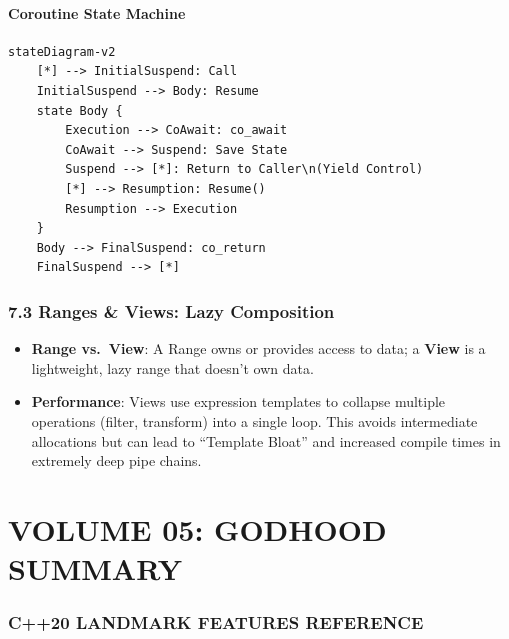 \hypertarget{coroutine-state-machine}{%
\paragraph{Coroutine State Machine}\label{coroutine-state-machine}}

\begin{lstlisting}
stateDiagram-v2
    [*] --> InitialSuspend: Call
    InitialSuspend --> Body: Resume
    state Body {
        Execution --> CoAwait: co_await
        CoAwait --> Suspend: Save State
        Suspend --> [*]: Return to Caller\n(Yield Control)
        [*] --> Resumption: Resume()
        Resumption --> Execution
    }
    Body --> FinalSuspend: co_return
    FinalSuspend --> [*]
\end{lstlisting}

\hypertarget{ranges-views-lazy-composition}{%
\subsubsection{7.3 Ranges \& Views: Lazy
Composition}\label{ranges-views-lazy-composition}}

\begin{itemize}
\tightlist
\item
  \textbf{Range vs.~View}: A Range owns or provides access to data; a
  \textbf{View} is a lightweight, lazy range that doesn't own data.
\item
  \textbf{Performance}: Views use expression templates to collapse
  multiple operations (filter, transform) into a single loop. This
  avoids intermediate allocations but can lead to ``Template Bloat'' and
  increased compile times in extremely deep pipe chains.
\end{itemize}

\hypertarget{volume-05-godhood-summary}{%
\section{VOLUME 05: GODHOOD SUMMARY}\label{volume-05-godhood-summary}}

\hypertarget{c20-landmark-features-reference}{%
\subsubsection{C++20 LANDMARK FEATURES
REFERENCE}\label{c20-landmark-features-reference}}

